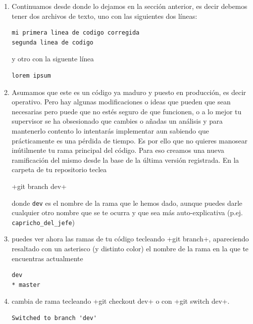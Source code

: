 \documentclass[a5paper, oneside,10pt]{article}
\begin{document}
    \begin{enumerate}
     \item Continuamos desde donde lo dejamos en la sección anterior, es decir debemos tener dos archivos de texto, uno con las siguientes dos líneas:
     \begin{lstlisting}[style=custom]
mi primera linea de codigo corregida
segunda linea de codigo
     \end{lstlisting}
     
     y otro con la siguente línea
     
    \begin{lstlisting}[style=custom]
lorem ipsum
    \end{lstlisting}
    
    \item Asumamos que este es un código ya maduro y puesto en producción, es decir operativo. Pero hay algunas modificaciones o ideas que pueden que sean necesarias pero puede que no estés seguro de que funcionen, o a lo mejor tu supervisor se ha obsesionado que cambies o añadas un análisis y para mantenerlo contento lo intentarás implementar aun sabiendo que prácticamente es una pérdida de tiempo. Es por ello que no quieres manosear inútilmente tu rama principal del código. Para eso creamos una nueva ramificación del mismo desde la base de la última versión registrada. En la carpeta de tu repositorio teclea
    
    \cverb+git branch dev+
    
    donde \verb+dev+ es el nombre de la rama que le hemos dado, aunque puedes darle cualquier otro nombre que se te ocurra y que sea más auto-explicativa (p.ej. \verb+capricho_del_jefe+)
    
    \item puedes ver ahora las ramas de tu código tecleando \cverb+git branch+, apareciendo resaltado con un asterisco (y distinto color) el nombre de la rama en la que te encuentras actualmente
    
    \begin{lstlisting}[style=custom]
  dev
* master
    \end{lstlisting}

    \item cambia de rama tecleando \cverb+git checkout dev+ o con \cverb+git switch dev+.
    
    \begin{lstlisting}[style=custom]
Switched to branch 'dev'
    \end{lstlisting}
    

\end{enumerate}
\end{document}
